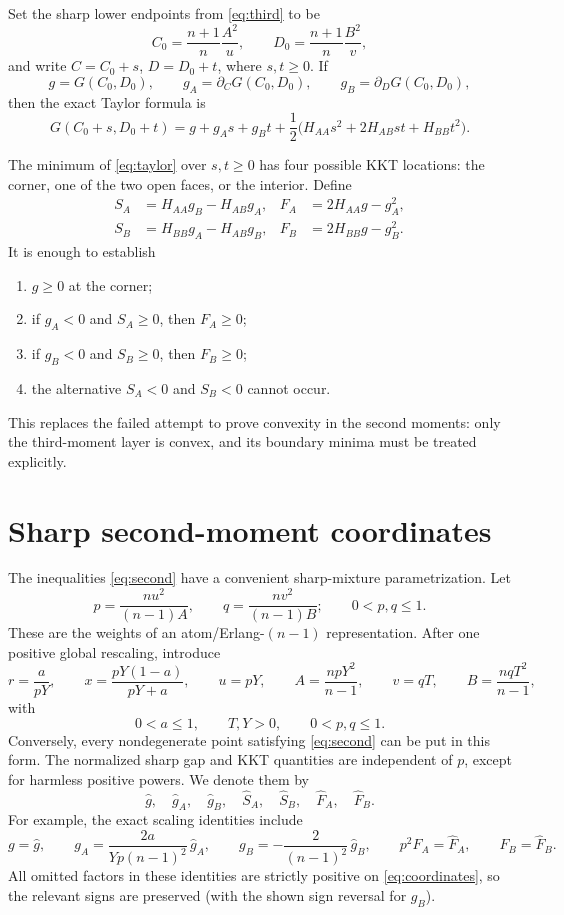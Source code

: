\documentclass[11pt]{article}
\begin{document}
Set the sharp lower endpoints from \eqref{eq:third} to be
\[
 C_0=\frac{n+1}{n}\frac{A^2}{u},\qquad
 D_0=\frac{n+1}{n}\frac{B^2}{v},
\]
and write $C=C_0+s$, $D=D_0+t$, where $s,t\ge0$.  If
\[
 g=G(C_0,D_0),\qquad g_A=\partial_CG(C_0,D_0),\qquad
 g_B=\partial_DG(C_0,D_0),
\]
then the exact Taylor formula is
\begin{equation}\label{eq:taylor}
 G(C_0+s,D_0+t)=g+g_As+g_Bt+
 \frac12\bigl(H_{AA}s^2+2H_{AB}st+H_{BB}t^2\bigr).
\end{equation}

The minimum of \eqref{eq:taylor} over $s,t\ge0$ has four possible KKT
locations: the corner, one of the two open faces, or the interior.  Define
\begin{align*}
 S_A&=H_{AA}g_B-H_{AB}g_A,&
 F_A&=2H_{AA}g-g_A^2,\\
 S_B&=H_{BB}g_A-H_{AB}g_B,&
 F_B&=2H_{BB}g-g_B^2.
\end{align*}
It is enough to establish
\begin{enumerate}
\item $g\ge0$ at the corner;
\item if $g_A<0$ and $S_A\ge0$, then $F_A\ge0$;
\item if $g_B<0$ and $S_B\ge0$, then $F_B\ge0$;
\item the alternative $S_A<0$ and $S_B<0$ cannot occur.
\end{enumerate}
This replaces the failed attempt to prove convexity in the second moments:
only the third-moment layer is convex, and its boundary minima must be treated
explicitly.

\section{Sharp second-moment coordinates}

The inequalities \eqref{eq:second} have a convenient sharp-mixture
parametrization.  Let
\[
 p=\frac{nu^2}{(n-1)A},\qquad q=\frac{nv^2}{(n-1)B};
 \qquad 0<p,q\le1.
\]
These are the weights of an atom/Erlang-$(n-1)$ representation.  After one
positive global rescaling, introduce
\begin{equation}\label{eq:coordinates}
 r=\frac{a}{pY},\qquad
 x=\frac{pY(1-a)}{pY+a},\qquad
 u=pY,\qquad A=\frac{npY^2}{n-1},
 \qquad v=qT,\qquad B=\frac{nqT^2}{n-1},
\end{equation}
with
\[
 0<a\le1,\qquad T,Y>0,\qquad 0<p,q\le1.
\]
Conversely, every nondegenerate point satisfying \eqref{eq:second} can be
put in this form.  The normalized sharp gap and KKT quantities are independent
of $p$, except for harmless positive powers.  We denote them by
\[
 \widehat g,\quad \widehat g_A,\quad \widehat g_B,\quad
 \widehat S_A,\quad \widehat S_B,\quad
 \widehat F_A,\quad \widehat F_B.
\]
For example, the exact scaling identities include
\[
 g=\widehat g,\qquad
 g_A=\frac{2a}{Yp(n-1)^2}\,\widehat g_A,\qquad
 g_B=-\frac{2}{(n-1)^2}\,\widehat g_B,\qquad
 p^2F_A=\widehat F_A,\qquad F_B=\widehat F_B.
\]
All omitted factors in these identities are strictly positive on
\eqref{eq:coordinates}, so the relevant signs are preserved (with the shown
sign reversal for $g_B$).
\end{document}
